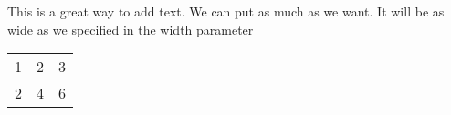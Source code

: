 \documentclass{book}
\begin{document}
\noindent\begin{minipage}{40em}
This is a great way to add text.  We can put as much as we want.  It will be as wide as we specified in the width parameter

\end{minipage}
\begin{table}[htb]
\begin{tabular}{lll}
1 & 2 & 3  \\
2 & 4 & 6 \\
\end{tabular}
\end{table}
\end{document}
